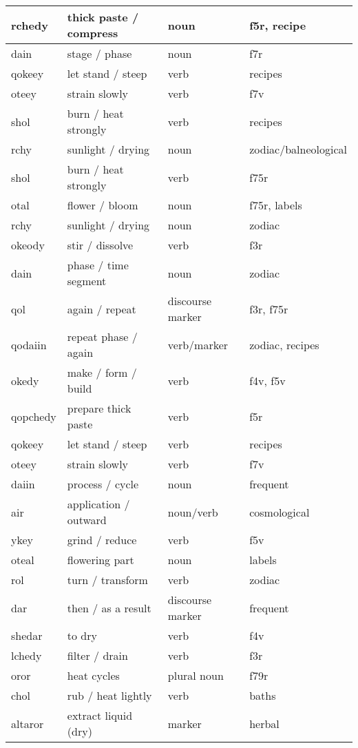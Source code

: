 \documentclass[12pt]{article}
\begin{document}
\begin{longtable}{|l|l|l|l|}
rchedy & thick paste / compress & noun & f5r, recipe \\ \hline
dain & stage / phase & noun & f7r \\ \hline
qokeey & let stand / steep & verb & recipes \\ \hline
oteey & strain slowly & verb & f7v \\ \hline
shol & burn / heat strongly & verb & recipes \\ \hline
rchy & sunlight / drying & noun & zodiac/balneological \\ \hline
shol & burn / heat strongly & verb & f75r \\ \hline
otal & flower / bloom & noun & f75r, labels \\ \hline
rchy & sunlight / drying & noun & zodiac \\ \hline
okeody & stir / dissolve & verb & f3r \\ \hline
dain & phase / time segment & noun & zodiac \\ \hline
qol & again / repeat & discourse marker & f3r, f75r \\ \hline
qodaiin & repeat phase / again & verb/marker & zodiac, recipes \\ \hline
okedy & make / form / build & verb & f4v, f5v \\ \hline
qopchedy & prepare thick paste & verb & f5r \\ \hline
qokeey & let stand / steep & verb & recipes \\ \hline
oteey & strain slowly & verb & f7v \\ \hline
daiin & process / cycle & noun & frequent \\ \hline
air & application / outward & noun/verb & cosmological \\ \hline
ykey & grind / reduce & verb & f5v \\ \hline
oteal & flowering part & noun & labels \\ \hline
rol & turn / transform & verb & zodiac \\ \hline
dar & then / as a result & discourse marker & frequent \\ \hline
shedar & to dry & verb & f4v \\ \hline
lchedy & filter / drain & verb & f3r \\ \hline
oror & heat cycles & plural noun & f79r \\ \hline
chol & rub / heat lightly & verb & baths \\ \hline
altaror & extract liquid (dry) & marker & herbal \\ \hline

\end{longtable}
\end{document}
